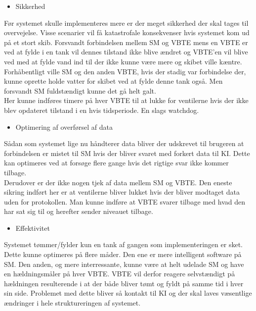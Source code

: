 \begin{large}\begin{itemize}
\item Sikkerhed
\end{itemize}\end{large}
Før systemet skulle implementeres mere er der meget sikkerhed der skal tages til overvejelse. Visse scenarier vil få katastrofale konsekvenser hvis systemet kom ud på et stort skib. Forsvandt forbindelsen mellem SM og VBTE mens en VBTE er ved at fylde i en tank vil dennes tilstand ikke blive ændret og VBTE'en vil blive ved med at fylde vand ind til der ikke kunne være mere og skibet ville kæntre. Forhåbentligt ville SM og den anden VBTE, hvis der stadig var forbindelse der, kunne oprette holde vatter for skibet ved at fylde denne tank også. Men forsvandt SM fuldstændigt kunne det gå helt galt.\\
Her kunne indføres timere på hver VBTE til at lukke for ventilerne hvis der ikke blev opdateret tilstand i en hvis tidsperiode. En slags watchdog.
\begin{large}\begin{itemize}
\item Optimering af overførsel af data
\end{itemize}\end{large}
Sådan som systemet lige nu håndterer data bliver der udskrevet til brugeren at forbindelsen er mistet til SM hvis der bliver svaret med forkert data til KI. Dette kan optimeres ved at forsøge flere gange hvis det rigtige svar ikke kommer tilbage. \\
Derudover er der ikke nogen tjek af data mellem SM og VBTE. Den eneste sikring indført her er at ventilerne bliver lukket hvis der bliver modtaget data uden for protokollen. Man kunne indføre at VBTE svarer tilbage med hvad den har sat sig til og herefter sender niveauet tilbage.
\begin{large}\begin{itemize}
\item Effektivitet
\end{itemize}\end{large}
Systemet tømmer/fylder kun en tank af gangen som implementeringen er sket. Dette kunne optimeres på flere måder. Den ene er mere intelligent software på SM. Den anden, og mere interressante, kunne være at helt udelade SM og have en hældningsmåler på hver VBTE. VBTE vil derfor reagere selvstændigt på hældningen resulterende i at der både bliver tømt og fyldt på samme tid i hver sin side. Problemet med dette bliver så kontakt til KI og der skal laves væsentlige ændringer i hele struktureringen af systemet.\\
